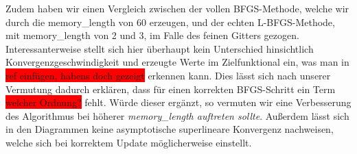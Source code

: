 Zudem haben wir einen Vergleich zwischen der vollen BFGS-Methode, welche wir durch die \textsf{memory\_length} von 60 erzeugen, und der echten L-BFGS-Methode, mit \textsf{memory\_length} von 2 und 3, im Falle des feinen Gitters gezogen. Interessanterweise stellt sich hier überhaupt kein Unterschied hinsichtlich Konvergenzgeschwindigkeit und erzeugte Werte im Zielfunktional ein, was man in \colorbox{red}{ref einfügen, habens doch gezeigt} erkennen kann. Dies lässt sich nach unserer Vermutung dadurch erklären, dass für einen korrekten BFGS-Schritt ein Term \colorbox{red}{ welcher Ordnung?} fehlt. Würde dieser ergänzt, so vermuten wir eine Verbesserung des Algorithmus bei höherer \textit{memory\_length auftreten sollte}. Außerdem lässt sich in den Diagrammen keine asymptotische superlineare Konvergenz nachweisen, welche sich bei korrektem Update möglicherweise einstellt.

